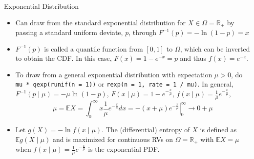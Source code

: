 \documentclass[
  ignorenonframetext,
]{beamer}
\providecommand{\tightlist}{%
  \setlength{\itemsep}{0pt}\setlength{\parskip}{0pt}}
\begin{document}
\begin{frame}[fragile]{Exponential Distribution}
\protect\hypertarget{exponential-distribution}{}
\begin{itemize}
\tightlist
\item
  Can draw from the standard exponential distribution for
  \(X \in \Omega = \mathbb{R}_+\) by passing a standard uniform deviate,
  \(p\), through \(F^{-1}\left(p\right) = -\ln\left(1 - p\right) = x\)
\item
  \(F^{-1}\left(p\right)\) is called a quantile function from
  \(\left[0,1\right]\) to \(\Omega\), which can be inverted to obtain
  the CDF. In this case, \(F\left(x\right) = 1 - e^{-x} = p\) and thus
  \(f\left(x\right) = e^{-x}\).
\item
  To draw from a general exponential distribution with expectation
  \(\mu > 0\), do \texttt{mu\ *\ qexp(runif(n\ =\ 1))} or
  \texttt{rexp(n\ =\ 1,\ rate\ =\ 1\ /\ mu)}. In general,
  \(F^{-1}\left(p \mid \mu\right) = -\mu \ln \left(1 - p\right)\),
  \(F\left(x \mid \mu\right) = 1 - e^{-\frac{x}{\mu}}\),
  \(f\left(x \mid \mu\right) = \frac{1}{\mu}e^{-\frac{x}{\mu}}\),
  \[\mu = \mathbb{E}X = \int_0^\infty x \frac{1}{\mu} e^{-\frac{x}{\mu}} dx = 
  \left.-\left(x + \mu\right)e^{-\frac{x}{\mu}}\right|_0^\infty \rightarrow
  0 + \mu\]
\item
  Let \(g\left(X\right) = -\ln f\left(x \mid \mu\right)\). The
  (differential) entropy of \(X\) is defined as
  \(\mathbb{E}g\left(X \mid \mu\right)\) and is maximized for continuous
  RVs on \(\Omega = \mathbb{R}_+\) with \(\mathbb{E}X = \mu\) when
  \(f\left(x \mid \mu\right) = \frac{1}{\mu}e^{-\frac{x}{\mu}}\) is the
  exponential PDF.
\end{itemize}
\end{frame}
\end{document}
